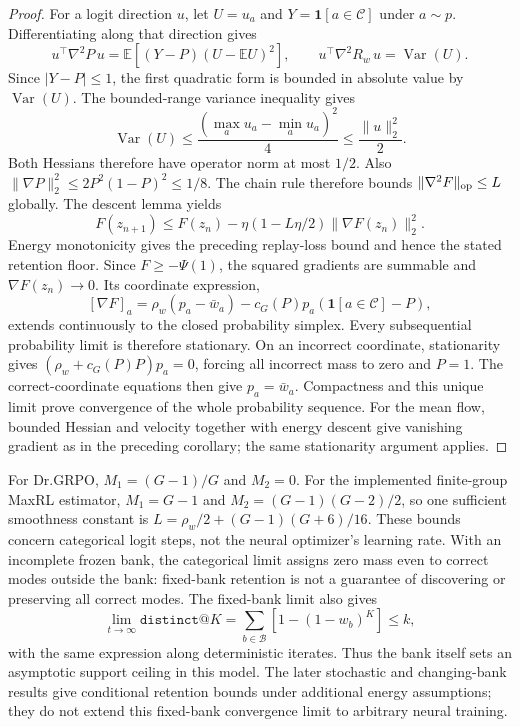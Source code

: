 \documentclass{article}
\newcommand{\1}{\mathbf 1}
\theoremstyle{remark}
\theoremstyle{definition}
\theoremstyle{plain}
\begin{document}
\begin{proof}
For a logit direction $u$, let $U=u_a$ and $Y=\mathbf1[a\in\mathcal C]$
under $a\sim p$. Differentiating along that direction gives
\[
 u^\top\nabla^2P\,u
 =\mathbb E[(Y-P)(U-\mathbb EU)^2],\qquad
 u^\top\nabla^2R_w\,u=\operatorname{Var}(U).
\]
Since $|Y-P|\le1$, the first quadratic form is bounded in absolute
value by $\operatorname{Var}(U)$. The bounded-range variance inequality gives
\[
 \operatorname{Var}(U)\le\frac{(\max_a u_a-\min_a u_a)^2}{4}
 \le\frac{\lVert u\rVert_2^2}{2}.
\]
Both Hessians therefore have operator norm at most $1/2$.
Also $\lVert\nabla P\rVert_2^2\le2P^2(1-P)^2\le1/8$.
The chain rule therefore bounds $\lVert\nabla^2F\rVert_{\rm op}\le L$
globally. The descent lemma yields
\[
 F(z_{n+1})\le F(z_n)
 -\eta(1-L\eta/2)\lVert\nabla F(z_n)\rVert_2^2.
\]
Energy monotonicity gives the preceding replay-loss bound and hence the
stated retention floor. Since $F\ge-\Psi(1)$, the squared gradients are
summable and $\nabla F(z_n)\to0$. Its coordinate expression,
\[
 [\nabla F]_a=\rho_w(p_a-\bar w_a)
 -c_G(P)p_a(\mathbf1[a\in\mathcal C]-P),
\]
extends continuously to the closed probability simplex. Every subsequential
probability limit is therefore stationary. On an incorrect coordinate,
stationarity gives $(\rho_w+c_G(P)P)p_a=0$, forcing all incorrect mass to
zero and $P=1$. The correct-coordinate equations then give $p_a=\bar w_a$.
Compactness and this unique limit prove convergence of the whole probability
sequence. For the mean flow, bounded Hessian and velocity together with
energy descent give vanishing gradient as in the preceding corollary;
the same stationarity argument applies.
\end{proof}

For Dr.GRPO, $M_1=(G-1)/G$ and $M_2=0$. For the implemented finite-group
MaxRL estimator, $M_1=G-1$ and $M_2=(G-1)(G-2)/2$, so one sufficient smoothness
constant is $L=\rho_w/2+(G-1)(G+6)/16$. These bounds concern categorical logit
steps, not the neural optimizer's learning rate. With an incomplete frozen
bank, the categorical limit assigns zero mass even to correct modes outside
the bank: fixed-bank retention is not a guarantee of discovering or preserving
all correct modes. The fixed-bank limit also gives
\[
 \lim_{t\to\infty}\texttt{distinct@}K
 =\sum_{b\in\mathcal B}[1-(1-w_b)^K]\le k,
\]
with the same expression along deterministic iterates. Thus the bank itself
sets an asymptotic support ceiling in this model. The later stochastic and changing-bank results give conditional
retention bounds under additional energy assumptions; they do not extend this
fixed-bank convergence limit to arbitrary neural training.
\end{document}
